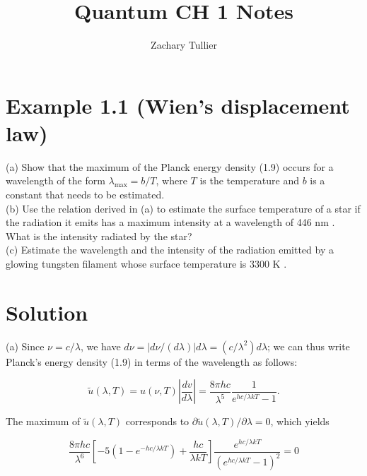 \documentclass[10pt]{article}
\begin{document}
\title{Quantum CH 1 Notes}
\author[1]{Zachary Tullier}
\date{}
\maketitle

\section*{Example 1.1 (Wien's displacement law)}
(a) Show that the maximum of the Planck energy density (1.9) occurs for a wavelength of the form $\lambda_{\max }=b / T$, where $T$ is the temperature and $b$ is a constant that needs to be estimated.\\
(b) Use the relation derived in (a) to estimate the surface temperature of a star if the radiation it emits has a maximum intensity at a wavelength of 446 nm . What is the intensity radiated by the star?\\
(c) Estimate the wavelength and the intensity of the radiation emitted by a glowing tungsten filament whose surface temperature is 3300 K .

\section*{Solution}
(a) Since $\nu=c / \lambda$, we have $d \nu=|d \nu /(d \lambda)| d \lambda=\left(c / \lambda^{2}\right) d \lambda$; we can thus write Planck's energy density (1.9) in terms of the wavelength as follows:


\begin{equation*}
\tilde{u}(\lambda, T)=u(\nu, T)\left|\frac{d v}{d \lambda}\right|=\frac{8 \pi h c}{\lambda^{5}} \frac{1}{e^{h c / \lambda k T}-1} . \tag{1.12}
\end{equation*}


The maximum of $\tilde{u}(\lambda, T)$ corresponds to $\partial \tilde{u}(\lambda, T) / \partial \lambda=0$, which yields


\begin{equation*}
\frac{8 \pi h c}{\lambda^{6}}\left[-5\left(1-e^{-h c / \lambda k T}\right)+\frac{h c}{\lambda k T}\right] \frac{e^{h c / \lambda k T}}{\left(e^{h c / \lambda k T}-1\right)^{2}}=0 \tag{1.13}
\end{equation*}
\end{document}
